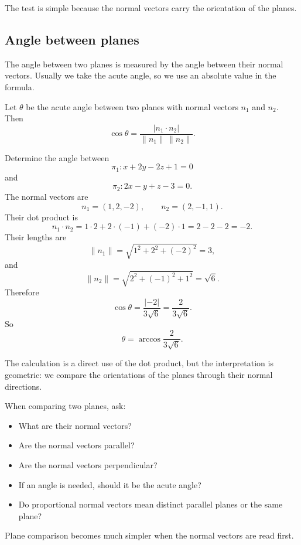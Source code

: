 The test is simple because the normal vectors carry the orientation of the planes.

\subsection*{Angle between planes}

The angle between two planes is measured by the angle between their normal vectors. Usually we take the acute angle, so we use an absolute value in the formula.

\begin{theorembox}
Let \(\theta\) be the acute angle between two planes with normal vectors \(n_1\) and \(n_2\). Then
\[
\cos\theta=\frac{|n_1\cdot n_2|}{\lVert n_1\rVert\,\lVert n_2\rVert}.
\]
\end{theorembox}

\begin{examplebox}
Determine the angle between
\[
\pi_1:x+2y-2z+1=0
\]
and
\[
\pi_2:2x-y+z-3=0.
\]
The normal vectors are
\[
n_1=(1,2,-2),
\qquad
n_2=(2,-1,1).
\]
Their dot product is
\[
n_1\cdot n_2=1\cdot2+2\cdot(-1)+(-2)\cdot1=2-2-2=-2.
\]
Their lengths are
\[
\lVert n_1\rVert=\sqrt{1^2+2^2+(-2)^2}=3,
\]
and
\[
\lVert n_2\rVert=\sqrt{2^2+(-1)^2+1^2}=\sqrt6.
\]
Therefore
\[
\cos\theta=\frac{|-2|}{3\sqrt6}=\frac{2}{3\sqrt6}.
\]
So
\[
\theta=\arccos\frac{2}{3\sqrt6}.
\]
\end{examplebox}

The calculation is a direct use of the dot product, but the interpretation is geometric: we compare the orientations of the planes through their normal directions.

\begin{summarybox}
When comparing two planes, ask:
\begin{itemize}
\item What are their normal vectors?
\item Are the normal vectors parallel?
\item Are the normal vectors perpendicular?
\item If an angle is needed, should it be the acute angle?
\item Do proportional normal vectors mean distinct parallel planes or the same plane?
\end{itemize}
\end{summarybox}

Plane comparison becomes much simpler when the normal vectors are read first.